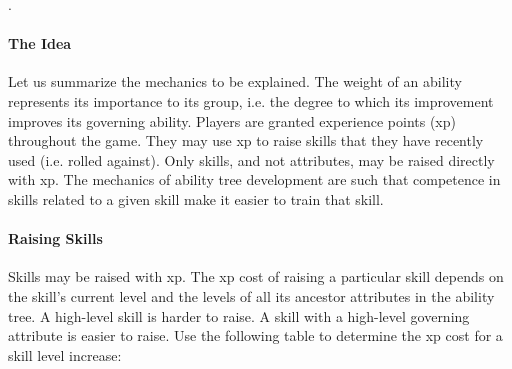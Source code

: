 \documentclass[12pt]{article}
\begin{document}
.

\paragraph{The Idea} Let us summarize the mechanics to be explained. The weight of an ability represents its importance to its group, i.e. the degree to which its improvement improves its governing ability.
Players are granted experience points (xp) throughout the game. They may use xp to raise skills that they have recently used (i.e. rolled against). Only skills, and not attributes, may be raised directly with xp.
The mechanics of ability tree development are such that competence in skills related to a given skill make it easier to train that skill.

\paragraph{Raising Skills}
Skills may be raised with xp.
The xp cost of raising a particular skill depends on
the skill's current level and the levels of all its ancestor attributes in the ability tree.
A high-level skill is harder to raise.
A skill with a high-level governing attribute is easier to raise.
Use the following table to determine the xp cost for a skill level increase:
\end{document}
